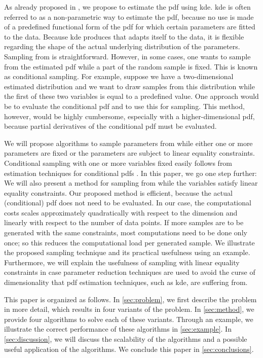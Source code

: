 As already proposed in \autocite{deGelder2017assessment}, we propose to estimate the \ac{pdf} using \ac{kde}.
\ac{kde} \autocite{parzen1962estimation, rosenblatt1956remarks} is often referred to as a non-parametric way to estimate the \ac{pdf}, because no use is made of a predefined functional form of the \ac{pdf} for which certain parameters are fitted to the data. 
\cstarta Because \ac{kde} produces  that adapts itself to the data, it is flexible regarding the shape of the actual underlying distribution of the parameters. \cenda
Sampling from  is straightforward.
However, in some cases, one wants to sample from the estimated \ac{pdf} while a part of the random sample is fixed.
This is known as conditional sampling. 
For example, suppose we have a two-dimensional estimated distribution and we want to draw samples from this distribution while the first of these two variables is equal to a predefined value. 
One approach would be to evaluate the conditional \ac{pdf} and to use this for sampling.
This method, however, would be highly cumbersome, especially with a higher-dimensional \ac{pdf}\cstarta, because partial derivatives of the conditional \ac{pdf} must be evaluated\cenda. 

We will propose algorithms to sample parameters from  while either one or more parameters are fixed or the parameters are subject to linear equality constraints.
Conditional sampling with one or more variables fixed easily follows from estimation techniques for conditional \acp{pdf} \autocite{hyndman1996estimating, holmes2007fast}.
In this paper, we go one step further: We will also present a method for sampling from  while the variables satisfy linear equality constraints. 
\cstarta Our proposed method is efficient, because the actual (conditional) \ac{pdf} does not need to be evaluated. \cenda
In our case, the computational costs scales approximately quadratically with respect to the dimension and linearly with respect to the number of data points. 
If more samples are to be generated with the same constraints, most computations need to be done only once; so this reduces the computational load per generated sample.
We illustrate the proposed sampling technique and its practical usefulness using an example.
Furthermore, we will explain the usefulness of sampling with linear equality constraints in case parameter reduction techniques are used to avoid the curse of dimensionality that \ac{pdf} estimation techniques, such as \ac{kde}, are suffering from.

This paper is organized as follows.
In \cref{sec:problem}, we first describe the problem in more detail, which results in four variants of the problem.
In \cref{sec:method}, we provide four algorithms to solve each of these variants.
Through an example, we illustrate the correct performance of these algorithms in \cref{sec:example}.
In \cref{sec:discussion}, we will discuss the scalability of the algorithms and a possible useful application of the algorithms. 
We conclude this paper in \cref{sec:conclusions}.

